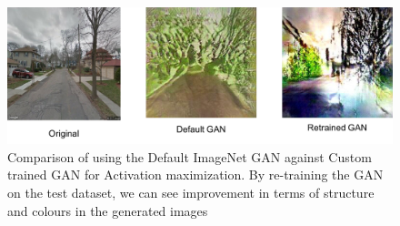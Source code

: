 
\begin{figure}[h]
	\centering
	\includegraphics[width=0.5\linewidth]{Plot/GanCompare.png}
	\caption{Comparison of using the Default ImageNet GAN against Custom trained GAN for Activation maximization. By re-training the GAN on the test dataset, we can see improvement in terms of structure and colours in the generated images}
	\label{fig:GanComparison}
\end{figure}

